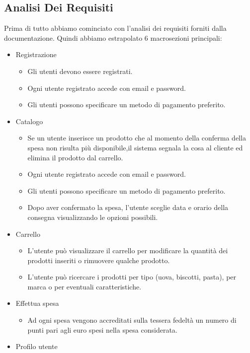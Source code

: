 \documentclass[12pt, a4paper]{article}
\numberwithin{equation}{section} %
\begin{document}
\subsection{Analisi Dei Requisiti}
Prima di tutto abbiamo cominciato con l'analisi dei requisiti forniti dalla documentazione. Quindi abbiamo estrapolato 6 macrosezioni principali:
\begin{itemize}
\item Registrazione
	\begin{itemize}
	\item Gli  utenti devono  essere  registrati.
	\item Ogni utente registrato accede con email e password.
	\item Gli utenti possono specificare un metodo di pagamento preferito.
	\end{itemize}
\item Catalogo
	\begin{itemize}
	\item  Se un utente inserisce un prodotto che al momento della conferma della spesa non risulta più disponibile,il sistema segnala la cosa al cliente ed elimina il prodotto dal carrello.
	\item Ogni utente registrato accede con email e password.
	\item Gli utenti possono specificare un metodo di pagamento preferito.
	\item Dopo aver confermato la spesa, l’utente sceglie data e orario della consegna visualizzando le opzioni possibili.
	\end{itemize}
\item Carrello
	\begin{itemize}
	\item L’utente può visualizzare il carrello per modificare la quantità dei prodotti inseriti o rimuovere qualche prodotto.
	\item L’utente può ricercare i prodotti per tipo (uova, biscotti, pasta), per marca o per eventuali caratteristiche.
	\end{itemize}
\item Effettua spesa
	\begin{itemize}
	\item  Ad ogni spesa vengono accreditati sulla tessera fedeltà un numero di punti pari agli euro spesi nella spesa considerata.
	\end{itemize}
\item Profilo utente

\end{itemize}
\end{document}
